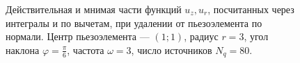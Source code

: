 \documentclass[a4paper, 12pt]{article}
\begin{document}
\begin{figure}[h]
    \begin{minipage}[h]{0.49\linewidth}
    \end{minipage}
    \hfill
    \begin{minipage}[h]{0.49\linewidth}
    \end{minipage}
    \caption{Действительная и мнимая части функций $u_z, u_r$, посчитанных через интегралы и по вычетам, при удалении от пьезоэлемента по нормали. Центр пьезоэлемента --- $(1; 1)$, радиус $r=3$, угол наклона $\varphi= \frac{\pi}{6}$, частота $\omega =3$, число источников $N_q=80$.}
    \label{resl}
    \end{figure}
\end{document}
